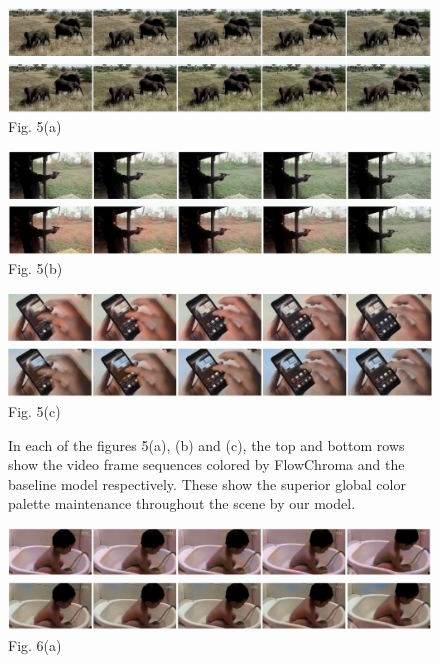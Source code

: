 \documentclass[10pt,twocolumn,letterpaper]{article}
\begin{document}
\begin{figure}[!h]
	\includegraphics[width=\textwidth]{fc-dk-elephants.jpg}
    \centering
    \label{}{\footnotesize Fig. 5(a)}
\end{figure}
\begin{figure}[!h]
	\includegraphics[width=\textwidth]{fc-dk-shooting.png}
	\centering    
    \label{}{\footnotesize Fig. 5(b)}
\end{figure}
\begin{figure}[!h]
	\includegraphics[width=\textwidth]{fc-dk-mobile-phone.jpg}
	\centering
    \label{center}{\footnotesize Fig. 5(c)}
    \caption{In each of the figures 5(a), (b) and (c), the top and bottom rows show the video frame sequences colored by FlowChroma and the baseline model respectively. These show the superior global color palette maintenance throughout the scene by our model.}
\end{figure}

\begin{figure}[!h]
\includegraphics[width=\textwidth]{fc-dk-baby-tub.png}
\centering
\label{}{\footnotesize Fig. 6(a)}
\vspace{5.00mm}
\end{figure}
\end{document}
